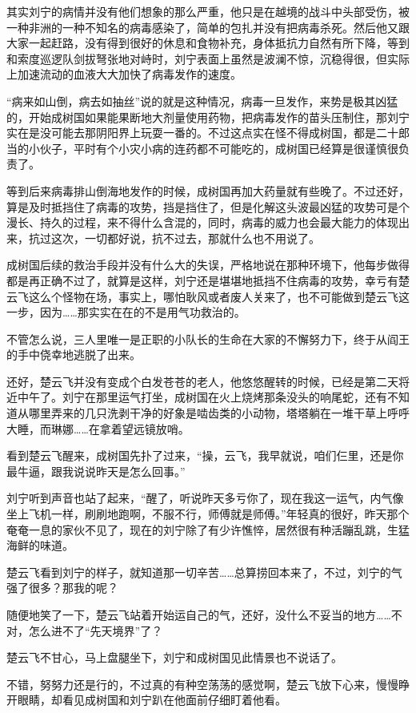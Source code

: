 其实刘宁的病情并没有他们想象的那么严重，他只是在越境的战斗中头部受伤，被一种非洲的一种不知名的病毒感染了，简单的包扎并没有把病毒杀死。然后他又跟大家一起赶路，没有得到很好的休息和食物补充，身体抵抗力自然有所下降，等到和索度巡逻队剑拔弩张地对峙时，刘宁表面上虽然是波澜不惊，沉稳得很，但实际上加速流动的血液大大加快了病毒发作的速度。

“病来如山倒，病去如抽丝”说的就是这种情况，病毒一旦发作，来势是极其凶猛的，开始成树国如果能果断地大剂量使用药物，把病毒发作的苗头压制住，那刘宁实在是没可能去那阴阳界上玩耍一番的。不过这点实在怪不得成树国，都是二十郎当的小伙子，平时有个小灾小病的连药都不可能吃的，成树国已经算是很谨慎很负责了。

等到后来病毒排山倒海地发作的时候，成树国再加大药量就有些晚了。不过还好，算是及时抵挡住了病毒的攻势，挡是挡住了，但是化解这头波最凶猛的攻势可是个漫长、持久的过程，来不得什么含混的，同时，病毒的威力也会最大能力的体现出来，抗过这次，一切都好说，抗不过去，那就什么也不用说了。

成树国后续的救治手段并没有什么大的失误，严格地说在那种环境下，他每步做得都是再正确不过了，就算是这样，刘宁还是堪堪地抵挡不住病毒的攻势，幸亏有楚云飞这么个怪物在场，事实上，哪怕耿风或者废人关来了，也不可能做到楚云飞这一步，因为……那实实在在的不是用气功救治的。

不管怎么说，三人里唯一是正职的小队长的生命在大家的不懈努力下，终于从阎王的手中侥幸地逃脱了出来。

还好，楚云飞并没有变成个白发苍苍的老人，他悠悠醒转的时候，已经是第二天将近中午了。刘宁在那里运气打坐，成树国在火上烧烤那条没头的响尾蛇，还有不知道从哪里弄来的几只洗剥干净的好象是啮齿类的小动物，塔塔躺在一堆干草上呼呼大睡，而琳娜……在拿着望远镜放哨。

看到楚云飞醒来，成树国先扑了过来，“操，云飞，我早就说，咱们仨里，还是你最牛逼，跟我说说昨天是怎么回事。”

刘宁听到声音也站了起来，“醒了，听说昨天多亏你了，现在我这一运气，内气像坐上飞机一样，刷刷地跑啊，不服不行，师傅就是师傅。”年轻真的很好，昨天那个奄奄一息的家伙不见了，现在的刘宁除了有少许憔悴，居然很有种活蹦乱跳，生猛海鲜的味道。

楚云飞看到刘宁的样子，就知道那一切辛苦……总算捞回本来了，不过，刘宁的气强了很多？那我的呢？

随便地笑了一下，楚云飞站着开始运自己的气，还好，没什么不妥当的地方……不对，怎么进不了“先天境界”了？

楚云飞不甘心，马上盘腿坐下，刘宁和成树国见此情景也不说话了。

不错，努努力还是行的，不过真的有种空荡荡的感觉啊，楚云飞放下心来，慢慢睁开眼睛，却看见成树国和刘宁趴在他面前仔细盯着他看。


